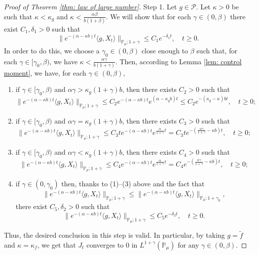 \documentclass[12pt,a4paper]{amsart}
\theoremstyle{plain}
\theoremstyle{definition}
\numberwithin{equation}{section}
\begin{document}
\begin{proof}[Proof of Theorem \ref{thm: law of large number}]
	Step 1. Let $g\in \mathcal P$.
	Let $\kappa > 0$ be such that $\kappa < \kappa_g$ and $\kappa < \frac{\alpha \beta}{b(1+\beta)}$.
	We will show that for each $\gamma \in (0,\beta)$ there exist
 $C_1,\delta_1 > 0$ such that
\[
	\|e^{-(\alpha - \kappa b)t} \langle g, X_t\rangle\|_{\mathbb P_\mu;1+\gamma}
	\leq C_1 e^{-\delta_1 t},
	\quad t\geq 0.
\]
	In order to do this, we choose a $\gamma_0 \in (0,\beta)$ close enough to $\beta$ such that, for each $\gamma \in [\gamma_0, \beta)$, we have $\kappa < \frac{\alpha\gamma}{b(1+\gamma)}$.
	Then, according to Lemma \ref{lem: control moment}, we have, for each $\gamma \in (0,\beta)$,
\begin{enumerate}
\item
	if $\gamma \in [\gamma_0, \beta)$ and $\alpha\gamma> \kappa_g (1+\gamma)b$, then there exists $C_2>0$ such that
\[
    \|e^{-(\alpha - \kappa b)t} \langle g, X_t\rangle\|_{\mathbb P_\mu;1+\gamma}
    \leq C_2 e^{-(\alpha-\kappa b)t}e^{(\alpha-\kappa_g b)t}
    \leq C_2  e^{-(\kappa_g - \kappa )bt},
    \quad t\geq 0;
\]
\item
	if $\gamma \in [\gamma_0, \beta)$ and $\alpha\gamma=\kappa_g(1+\gamma)b$, then there exists $C_3>0$ such that
\[
    \|e^{-(\alpha - \kappa b)t} \langle g, X_t\rangle\|_{\mathbb P_\mu;1+\gamma}
    \leq C_3 t e^{-(\alpha - \kappa b)t}e^{\frac{\alpha}{1+\gamma}t}
    = C_3 t e^{-(\frac{\alpha \gamma}{1+\gamma} - \kappa b)t},
    \quad t\geq 0;
\]
\item
	if $\gamma \in [\gamma_0, \beta)$ and $\alpha\gamma < \kappa_g (1+\gamma)b$, then there exists $C_4>0$ such that
\[
    \|e^{-(\alpha - \kappa b)t} \langle g, X_t\rangle\|_{\mathbb{P}_{\mu};1+\gamma}
    \leq C_4  e^{-(\alpha - \kappa b)t}e^{\frac{\alpha}{1+\gamma}t}
    = C_4  e^{-(\frac{\alpha \gamma}{1+\gamma} - \kappa b)t},
    \quad t\geq 0;
\]
\item
	if $\gamma \in (0,\gamma_0)$ then, thanks to (1)--(3) above and the fact that \[\|e^{-(\alpha - \kappa b)t} \langle g, X_t\rangle\|_{\mathbb{P}_{\mu};1+\gamma}
	\leq \|e^{-(\alpha - \kappa b)t} \langle g, X_t\rangle\|_{\mathbb{P}_{\mu};1+\gamma_0},\] there exist $C_5, \delta_2 >0$ such that
\[
	\|e^{-(\alpha - \kappa b)t} \langle g, X_t\rangle\|_{\mathbb{P}_{\mu};1+\gamma}
	\leq C_5e^{-\delta_2 t},
	\quad t\geq 0.
\]
\end{enumerate}
	Thus, the desired conclusion in this step is valid.
	In particular, by taking $g = \widetilde f$ and $\kappa = \kappa_f$, we get that $J_t$ converges to $0$ in $L^{1+\gamma}(\mathbb{P}_{\mu})$ for any $\gamma\in(0,\beta)$.


\end{proof}
\end{document}
